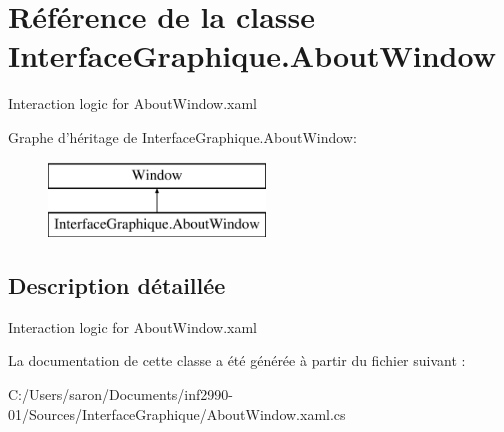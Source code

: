 \hypertarget{class_interface_graphique_1_1_about_window}{\section{Référence de la classe Interface\-Graphique.\-About\-Window}
\label{class_interface_graphique_1_1_about_window}
}


Interaction logic for About\-Window.\-xaml  


Graphe d'héritage de Interface\-Graphique.\-About\-Window\-:\begin{figure}[H]
\begin{center}
\leavevmode
\includegraphics[height=2.000000cm]{class_interface_graphique_1_1_about_window}
\end{center}
\end{figure}


\subsection{Description détaillée}
Interaction logic for About\-Window.\-xaml 



La documentation de cette classe a été générée à partir du fichier suivant \-:\begin{DoxyCompactItemize}
\item 
C\-:/\-Users/saron/\-Documents/inf2990-\/01/\-Sources/\-Interface\-Graphique/About\-Window.\-xaml.\-cs\end{DoxyCompactItemize}
